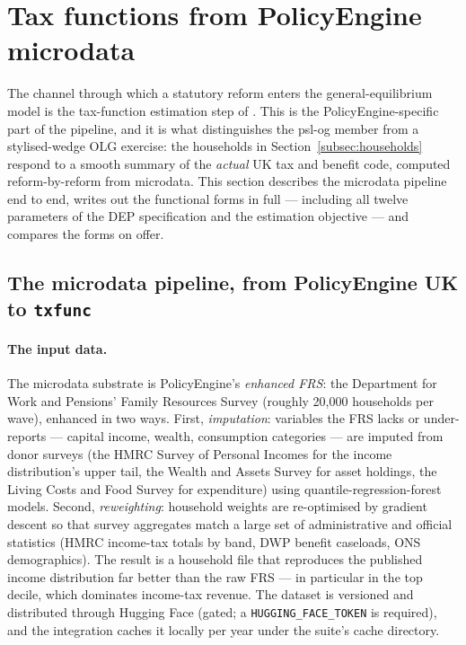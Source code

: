 \section{Tax functions from PolicyEngine microdata}
\label{sec:taxfunc}

The channel through which a statutory reform enters the general-equilibrium model is the tax-function estimation step of \citet{DeBackerEvansPhillips2019}. This is the PolicyEngine-specific part of the pipeline, and it is what distinguishes the psl-og member from a stylised-wedge OLG exercise: the households in Section~\ref{subsec:households} respond to a smooth summary of the \emph{actual} UK tax and benefit code, computed reform-by-reform from microdata. This section describes the microdata pipeline end to end, writes out the functional forms in full --- including all twelve parameters of the DEP specification and the estimation objective --- and compares the forms on offer.

\subsection{The microdata pipeline, from PolicyEngine UK to \texttt{txfunc}}
\label{subsec:txpipeline}

\paragraph{The input data.} The microdata substrate is PolicyEngine's \emph{enhanced FRS}: the Department for Work and Pensions' Family Resources Survey (roughly 20,000 households per wave), enhanced in two ways. First, \emph{imputation}: variables the FRS lacks or under-reports --- capital income, wealth, consumption categories --- are imputed from donor surveys (the HMRC Survey of Personal Incomes for the income distribution's upper tail, the Wealth and Assets Survey for asset holdings, the Living Costs and Food Survey for expenditure) using quantile-regression-forest models. Second, \emph{reweighting}: household weights are re-optimised by gradient descent so that survey aggregates match a large set of administrative and official statistics (HMRC income-tax totals by band, DWP benefit caseloads, ONS demographics). The result is a household file that reproduces the published income distribution far better than the raw FRS --- in particular in the top decile, which dominates income-tax revenue. The dataset is versioned and distributed through Hugging Face (gated; a \texttt{HUGGING\_FACE\_TOKEN} is required), and the integration caches it locally per year under the suite's cache directory.

